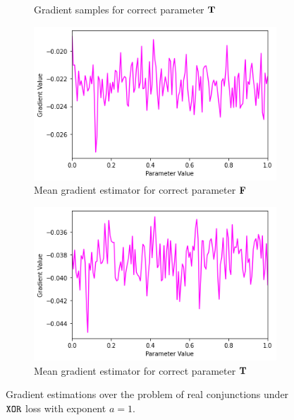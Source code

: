 \begin{figure}[H]
\begin{subfigure}[b]{0.47\textwidth}
        \caption{Gradient samples for correct parameter $\textbf{T}$}
        \label{fig:conjgrad1true}
    \end{subfigure}
    \begin{subfigure}[b]{0.47\textwidth}
        \centering
        \includegraphics[width=\textwidth]{imgs/grad_prod_1_falseparam_avg.png}
        \caption{Mean gradient estimator for correct parameter $\textbf{F}$}
        \label{fig:conjgrad1falseavg}
    \end{subfigure}
    \begin{subfigure}[b]{0.47\textwidth}
        \centering
        \includegraphics[width=\textwidth]{imgs/grad_prod_1_trueparam_avg.png}
        \caption{Mean gradient estimator for correct parameter $\textbf{T}$}
        \label{fig:conjgrad1trueavg}
    \end{subfigure}
       \caption{Gradient estimations over the problem of real conjunctions under $\texttt{XOR}$ loss with exponent $a=1$.}
       \label{fig:conjgrad1}
\end{figure}

